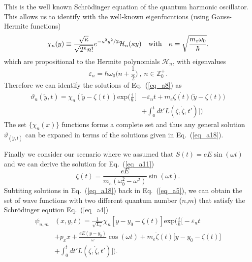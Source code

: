 This is the well known Schrödinger equation of the quantum harmonic oscillator.
This allows us to identify with the well-known eigenfucntions (using Gauss-Hermite functions)
\begin{equation} \label{eq_a16}
  \chi_n(y) \equiv
   \frac{\sqrt{\kappa}}{\sqrt{2^{n}n!}}
  e^{-\kappa^2 y^2/2}
  \mathcal{H}_n \qty(\kappa y) \quad \text{with}
  \quad
  \kappa = \sqrt{\frac{m_e \omega_0}{\hbar}},
\end{equation}
which are propositional to the Hermite polynomials $\mathcal{H}_n$, with eigenvalues
\begin{equation} \label{eq_a17}
  \varepsilon_n = \hbar \omega_0 \big(n + \frac{1}{2}\big)
  ~,~
  n \in \mathbb{Z}^{+}_0.
\end{equation}
Therefore we can identify the solutions of Eq.~(\ref{eq_a8}) as
\begin{equation} \label{eq_a18}
  \begin{aligned}
    \vartheta_n(\tilde{y},t) = \chi_n(\tilde{y} - \zeta(t))
     \text{exp}\bigg(\frac{i}{\hbar}\bigg[&- \varepsilon_nt +
    m_e\dot{\zeta(t)}\big(\tilde{y}-\zeta(t)\big) \\
     & + \int_0^{t}dt'L(\zeta,\dot{\zeta},t')\bigg]\bigg)
  \end{aligned}
\end{equation}
The set $\{\chi_n(x)\}$ functions forms a complete set and thus any general solution $\vartheta_(\tilde{y},t)$ can be expaned in terms of the solutions given in Eq.~(\ref{eq_a18}).

Finally we consider our scenario where we assumed that $S(t) = eE\sin(\omega t)$ and we can derive the solution for Eq.~(\ref{eq_a11})
\begin{equation} \label{eq_a19}
  \zeta(t) = \frac{eE}{m_e(\omega_0^2 - \omega^2)}\sin(\omega t).
\end{equation}
Subtiting solutions in Eq.~(\ref{eq_a18}) back in Eq.~(\ref{eq_a5}), we can obtain the set of wave functions with two different quantum number ($n$,$m$) that satisfy the Schrödinger eqution Eq.~(\ref{eq_a4})
\begin{equation} \label{eq_a20}
  \begin{aligned}
    \psi_{n,m}&(x,y,t)  = \frac{1}{\sqrt{L_x}}
    \chi_n\left[y - y_0 - \zeta(t)\right]
    \text{exp}\bigg(
    \frac{i}{\hbar}\bigg[- \varepsilon_nt \\
    &
    + p_x x + \frac{eE(y - y_0)}{\omega}\cos(\omega t)+
    m_e\dot{\zeta}(t)\big[y - y_0 -\zeta(t)\big]\\
    & +
    \int_0^{t}dt'L(\zeta,\dot{\zeta},t')\bigg]\bigg).
  \end{aligned}
\end{equation}
